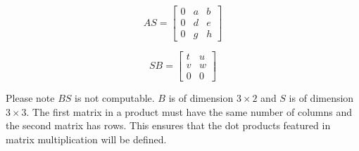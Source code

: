 \documentclass{article}
\begin{document}
$$AS= \left[\begin{array}{ccc}
0& a & b \\
0& d & e \\
0& g & h 
\end{array}\right]$$

$$SB =\left[\begin{array}{ccc}
t & u\\
v & w \\
0 & 0
\end{array}\right]$$

Please note $BS$ is not computable. $B$ is of dimension $3\times 2$ and $S$ is of dimension $3\times 3$. The first matrix in a product must have the same number of columns and the second matrix has rows. This ensures that the dot products featured in matrix multiplication will be defined. 
\end{document}
